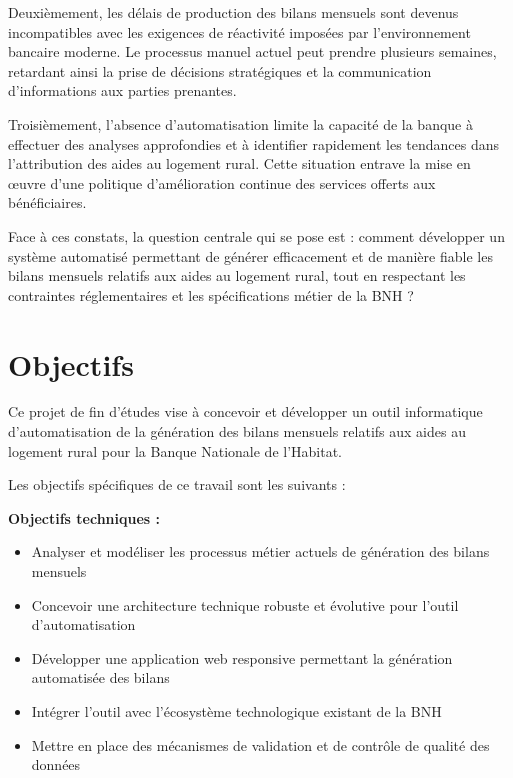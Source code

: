 \medskip

Deuxièmement, les délais de production des bilans mensuels sont devenus incompatibles avec les exigences de réactivité imposées par l'environnement bancaire moderne. Le processus manuel actuel peut prendre plusieurs semaines, retardant ainsi la prise de décisions stratégiques et la communication d'informations aux parties prenantes.

\medskip

Troisièmement, l'absence d'automatisation limite la capacité de la banque à effectuer des analyses approfondies et à identifier rapidement les tendances dans l'attribution des aides au logement rural. Cette situation entrave la mise en œuvre d'une politique d'amélioration continue des services offerts aux bénéficiaires.

\medskip

Face à ces constats, la question centrale qui se pose est : comment développer un système automatisé permettant de générer efficacement et de manière fiable les bilans mensuels relatifs aux aides au logement rural, tout en respectant les contraintes réglementaires et les spécifications métier de la BNH ?

\section*{Objectifs}

Ce projet de fin d'études vise à concevoir et développer un outil informatique d'automatisation de la génération des bilans mensuels relatifs aux aides au logement rural pour la Banque Nationale de l'Habitat.

\medskip

Les objectifs spécifiques de ce travail sont les suivants :

\medskip

\textbf{Objectifs techniques :}
\begin{itemize}
    \item Analyser et modéliser les processus métier actuels de génération des bilans mensuels
    \item Concevoir une architecture technique robuste et évolutive pour l'outil d'automatisation
    \item Développer une application web responsive permettant la génération automatisée des bilans
    \item Intégrer l'outil avec l'écosystème technologique existant de la BNH
    \item Mettre en place des mécanismes de validation et de contrôle de qualité des données
\end{itemize}

